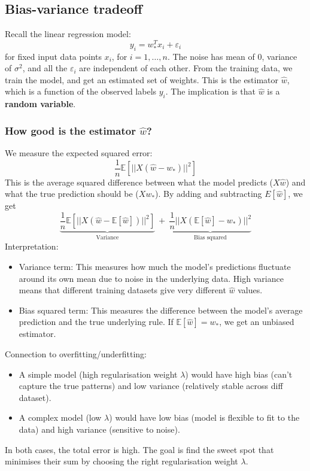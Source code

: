 \documentclass[../Probability.tex]{subfiles}
\begin{document}
\subsection{Bias-variance tradeoff}
Recall the linear regression model:
$$y_i = w_*^T x_i + \varepsilon_i$$
for fixed input data points $x_i$, for $i=1,\ldots,n$.\newline
The noise has mean of 0, variance of $\sigma^2$, and all the $\varepsilon_i$ are independent of each other.\newline
From the training data, we train the model, and get an estimated set of weights.
This is the estimator $\hat{w}$, which is a function of the observed labels $y_i$.
The implication is that $\hat{w}$ is a \textbf{random variable}.
\subsubsection{How good is the estimator $\hat{w}$?}
We measure the expected squared error:
$$\frac{1}{n} \mathbb{E}[||X(\hat{w} - w_*)||^2]$$
This is the average squared difference between what the model predicts ($X\hat{w}$) and what the true prediction should be ($Xw_*$).\newline
By adding and subtracting $E[\hat{w}]$, we get
$$\underbrace{\frac{1}{n} \mathbb{E}[||X(\hat{w} - \mathbb{E}[\hat{w}])||^2]}_{\text{Variance}} \:+\: \underbrace{\frac{1}{n} ||X(\mathbb{E}[\hat{w}] - w_*)||^2}_{\text{Bias squared}}$$
Interpretation:
\begin{itemize}
    \item Variance term: This measures how much the model's predictions fluctuate around its own mean due to noise in the underlying data.
    High variance means that different training datasets give very different $\hat{w}$ values.
    \item Bias squared term: This measures the difference between the model's average prediction and the true underlying rule. If $\mathbb{E}[\hat{w}] = w_*$, we get an unbiased estimator.
\end{itemize}
Connection to overfitting/underfitting:
\begin{itemize}
    \item A simple model (high regularisation weight $\lambda$) would have high bias (can't capture the true patterns) and low variance (relatively stable across diff dataset).
    \item A complex model (low $\lambda$) would have low bias (model is flexible to fit to the data) and high variance (sensitive to noise).
\end{itemize}
In both cases, the total error is high. The goal is find the sweet spot that minimises their sum by choosing the right regularisation weight $\lambda$.
\end{document}
